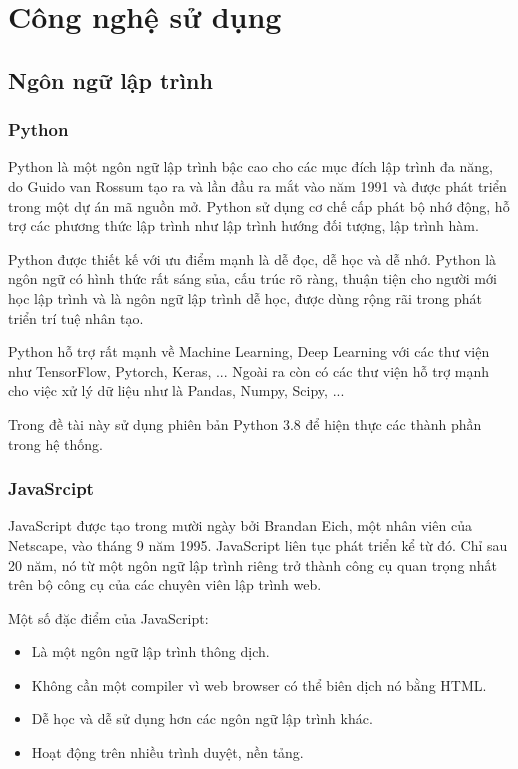 \chapter{Công nghệ sử dụng}

\section{Ngôn ngữ lập trình}
\subsection{Python}
Python là một ngôn ngữ lập trình bậc cao cho các mục đích lập trình đa năng, do Guido van Rossum tạo ra và lần đầu ra mắt vào năm 1991 và được phát triển trong một dự án mã nguồn mở. Python sử dụng cơ chế cấp phát bộ nhớ động, hỗ trợ các phương thức lập trình như lập trình hướng đối tượng, lập trình hàm.

Python được thiết kế với ưu điểm mạnh là dễ đọc, dễ học và dễ nhớ. Python là ngôn ngữ có hình thức rất sáng sủa, cấu trúc rõ ràng, thuận tiện cho người mới học lập trình và là ngôn ngữ lập trình dễ học, được dùng rộng rãi trong phát triển trí tuệ nhân tạo.

Python hỗ trợ rất mạnh về Machine Learning, Deep Learning với các thư viện như TensorFlow, Pytorch, Keras, ... Ngoài ra còn có các thư viện hỗ trợ mạnh cho việc xử lý dữ liệu như là Pandas, Numpy, Scipy, ...

Trong đề tài này sử dụng phiên bản Python 3.8 để hiện thực các thành phần trong hệ thống.

\subsection{JavaSrcipt}
JavaScript được tạo trong mười ngày bởi Brandan Eich, một nhân viên của Netscape, vào tháng 9 năm 1995. JavaScript liên tục phát triển kể từ đó. Chỉ sau 20 năm, nó từ một ngôn ngữ lập trình riêng trở thành công cụ quan trọng nhất trên bộ công cụ của các chuyên viên lập trình web.

Một số đặc điểm của JavaScript:

\begin{itemize}
    \item Là một ngôn ngữ lập trình thông dịch.
    \item Không cần một compiler vì web browser có thể biên dịch nó bằng HTML.
    \item Dễ học và dễ sử dụng hơn các ngôn ngữ lập trình khác.
    \item Hoạt động trên nhiều trình duyệt, nền tảng.
\end{itemize}

